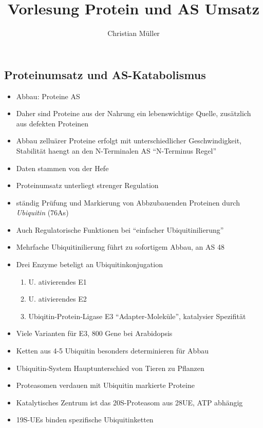 \documentclass{article}
\begin{document}
\title{Vorlesung Protein und AS Umsatz}
\author{Christian Müller}

\subsection{Proteinumsatz und AS-Katabolismus}

\begin{itemize}
	\item Abbau: Proteine \textrightarrow AS 
	\item Daher sind Proteine aus der Nahrung ein lebenswichtige Quelle,
		zusätzlich aus defekten Proteinen
	\\ \hline
	\item Abbau zelluärer Proteine erfolgt mit unterschiedlicher Geschwindigkeit,
		Stabilität haengt an den N-Terminalen AS \textrightarrow ``N-Terminus Regel''
	\item Daten stammen von der Hefe
		\\ \hline
	\item Proteinumsatz unterliegt strenger Regulation
	\item ständig Prüfung und Markierung von Abbzubauenden Proteinen durch \textsl{Ubiquitin} (76As)
	\item Auch Regulatorische Funktionen bei ``einfacher Ubiquitinilierung''
	\item Mehrfache Ubiquitinilierung führt zu sofortigem Abbau, an AS 48
	\\ \hline
	\item Drei Enzyme beteligt an Ubiquitinkonjugation
		\begin{enumerate}
			\item U. ativierendes E1
			\item U. ativierendes E2
			\item Ubiqitin-Protein-Ligase E3 ``Adapter-Moleküle'', katalysier Spezifität
		\end{enumerate}
	\item Viele Varianten für E3, 800 Gene bei Arabidopsis
	\item Ketten aus 4-5 Ubiquitin besonders determinieren für Abbau
	\item \textrightarrow Ubiquitin-System Hauptunterschied von Tieren zu Pflanzen
	\\ \hline
	\item Proteasomen verdauen mit Ubiquitin markierte Proteine
	\item Katalytisches Zentrum ist das 20S-Proteasom aus 28UE, ATP abhängig
	\item 19S-UEs binden spezifische Ubiquitinketten

\end{itemize}
\end{document}
